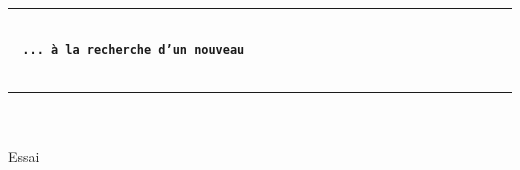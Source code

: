 \documentclass{article}
\title{}
\author{\textsf{\textbf{Yann Ics}}}
\date{}
\begin{document}
\makeatletter
  \begin{titlepage}
  \centering
  {\Large \@author} \\
  \rule{\linewidth}{.5pt}
  \vspace{4cm}
  {\LARGE \textbf{\@title}} \\
   \vspace{6 mm}
   {\color{brown} {\Large \textbf{\texttt{\, ... à la recherche d'un nouveau}}}}\\
   \vspace{2mm}
   {}\\
  \vfill
  \rule{\linewidth}{.5pt}
     {\Large \textsf{\textsl{}}}\\ 
     {\Large \textsf{\textsl{}}}\\ 	
     {\Large \textsf{Essai}}\\
\end{titlepage}
\makeatother

\pagecolor{white}
\end{document}
